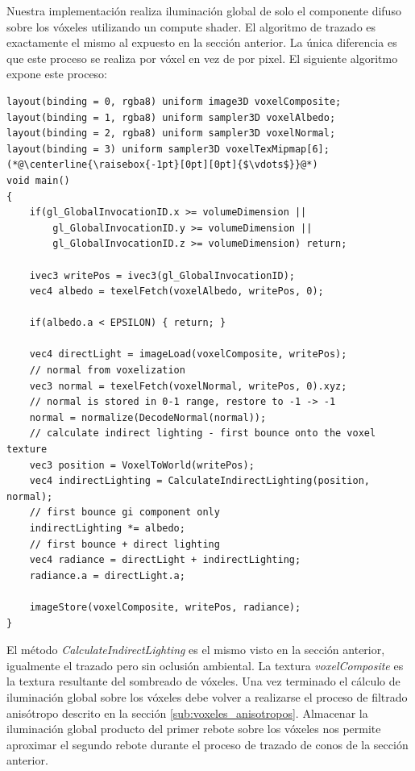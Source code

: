 Nuestra implementación realiza iluminación global de solo el componente difuso sobre los vóxeles utilizando un compute shader. El algoritmo de trazado es exactamente el mismo al expuesto en la sección anterior. La única diferencia es que este proceso se realiza por vóxel en vez de por pixel. El siguiente algoritmo expone este proceso:
\\
\begin{lstlisting}[caption={Iluminacion global sobre voxeles.}, label=VoxelGI]
layout(binding = 0, rgba8) uniform image3D voxelComposite;
layout(binding = 1, rgba8) uniform sampler3D voxelAlbedo;
layout(binding = 2, rgba8) uniform sampler3D voxelNormal;
layout(binding = 3) uniform sampler3D voxelTexMipmap[6];
(*@\centerline{\raisebox{-1pt}[0pt][0pt]{$\vdots$}}@*)
void main()
{
    if(gl_GlobalInvocationID.x >= volumeDimension ||
        gl_GlobalInvocationID.y >= volumeDimension ||
        gl_GlobalInvocationID.z >= volumeDimension) return;

    ivec3 writePos = ivec3(gl_GlobalInvocationID);
    vec4 albedo = texelFetch(voxelAlbedo, writePos, 0);

    if(albedo.a < EPSILON) { return; }

    vec4 directLight = imageLoad(voxelComposite, writePos);
    // normal from voxelization
    vec3 normal = texelFetch(voxelNormal, writePos, 0).xyz;
    // normal is stored in 0-1 range, restore to -1 -> -1
    normal = normalize(DecodeNormal(normal));
    // calculate indirect lighting - first bounce onto the voxel texture
    vec3 position = VoxelToWorld(writePos);
    vec4 indirectLighting = CalculateIndirectLighting(position, normal);
    // first bounce gi component only
    indirectLighting *= albedo;
    // first bounce + direct lighting
    vec4 radiance = directLight + indirectLighting;
    radiance.a = directLight.a;

    imageStore(voxelComposite, writePos, radiance);
}
\end{lstlisting}
El método \emph{CalculateIndirectLighting} es el mismo visto en la sección anterior, igualmente el trazado pero sin oclusión ambiental. La textura \emph{voxelComposite} es la textura resultante del sombreado de vóxeles. Una vez terminado el cálculo de iluminación global sobre los vóxeles debe volver a realizarse el proceso de filtrado anisótropo descrito en la sección \ref{sub:voxeles_anisotropos}. Almacenar la iluminación global producto del primer rebote sobre los vóxeles nos permite aproximar el segundo rebote durante el proceso de trazado de conos de la sección anterior.
